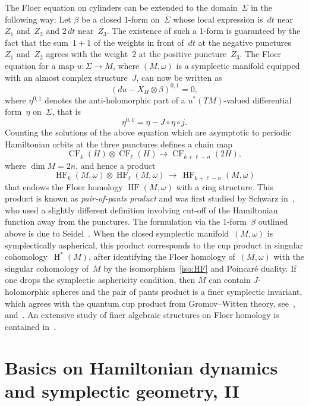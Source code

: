 \documentclass[12pt,twoside]{amsart}
\theoremstyle{plain}
\numberwithin{figure}{section}
\numberwithin{equation}{section}
\def\H{\operatorname{H}}
\def\CF{\operatorname{CF}}
\def\HF{\operatorname{HF}}
\def\go{\omega}
\begin{document}
The Floer equation on cylinders can be extended to the domain~$\Sigma$ in the following way: 
Let $\beta$ be a closed 1-form on~$\Sigma$ whose local expression is~$dt$ near~$Z_1$ and~$Z_2$ and $2 \, dt$ 
near~$Z_3$. The existence of such a 1-form is guaranteed by the fact that the sum~$1+1$ of the weights in front of~$dt$ at the negative punctures~$Z_1$ and~$Z_2$ agrees with the weight~$2$ at the positive puncture~$Z_3$. 
The Floer equation for a map $u \colon \Sigma \rightarrow M$, 
where $(M,\go)$ is a symplectic manifold equipped with an almost complex structure~$J$, 
can now be written as
\[
(du - X_H \otimes \beta)^{0,1} = 0,
\]
where $\eta^{0,1}$ denotes the anti-holomorphic part of a $u^*(TM)$-valued differential form~$\eta$ on~$\Sigma$, 
that is
\[
\eta^{0,1} = \eta - J \circ \eta \circ j.
\]
Counting the solutions of the above equation which are asymptotic to periodic Hamiltonian orbits at the three punctures defines a chain map 
\[
\CF_k (H) \otimes \CF_\ell (H) \to \CF_{k+\ell-n} (2H),
\]
where $\dim M =2n$, and hence a product 
\begin{equation} \label{e:pp}
\HF_k (M,\go) \otimes \HF_\ell (M,\go) \,\to\, \HF_{k+\ell-n} (M,\go) 
\end{equation}
that endows the Floer homology $\HF (M,\go)$ with a ring structure. This product is known as {\it pair-of-pants product}\/ and was first studied by Schwarz in~\cite{Schw95}, who used a slightly different definition involving cut-off of the Hamiltonian function away from the punctures. The formulation via the 1-form~$\beta$ outlined above is due to Seidel~\cite{sei08}. When the closed symplectic manifold~$(M,\omega)$ is symplectically aspherical, this product corresponds to the cup product in singular cohomology~$\H^*(M)$, after identifying the Floer homology of~$(M,\omega)$ with the singular cohomology of~$M$ by the isomorphism~\eqref{iso:HF} and Poincar\'e duality.
If one drops the symplectic asphericity condition, 
then $M$ can contain $J$-holomorphic spheres and the pair of pants product
is a finer symplectic invariant, which agrees with the quantum cup product from Gromov--Witten theory, 
see~\cite{PiSaSch94},~\cite{LT99} and~\cite[\S 12.2]{McSal12}. 
An extensive study of finer algebraic structures on Floer homology is contained in~\cite{Rit13}.





\section{Basics on Hamiltonian dynamics and symplectic geometry, II}
\label{s:basicsII}
\end{document}
